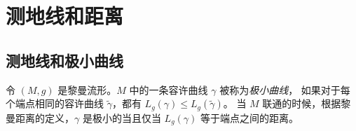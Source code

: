 \chapter{测地线和距离}

\section{测地线和极小曲线}

令 $(M,g)$ 是黎曼流形。$M$ 中的一条容许曲线 $\gamma$ 被称为\emph{极小曲线}，
如果对于每个端点相同的容许曲线 $\tilde\gamma$，都有 $L_g(\gamma) \leq L_g(\tilde\gamma)$。
当 $M$ 联通的时候，根据黎曼距离的定义，$\gamma$ 是极小的当且仅当
$L_g(\gamma)$ 等于端点之间的距离。





